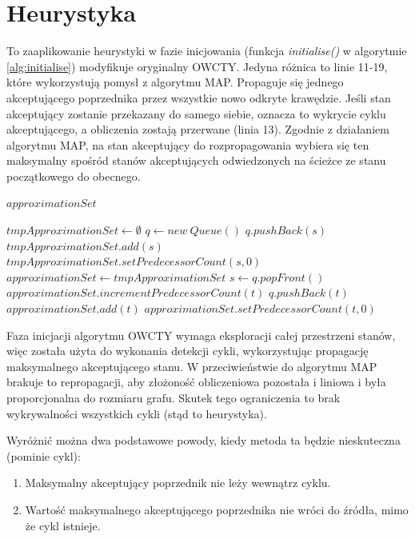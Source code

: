 \section{Heurystyka} \label{heuristic}

To zaaplikowanie heurystyki w fazie inicjowania (funkcja \textit{initialise()} w algorytmie \ref{alg:initialise}) modyfikuje oryginalny OWCTY.
Jedyna różnica to linie 11-19, które wykorzystują pomysł z algorytmu MAP.
Propaguje się jednego akceptującego poprzednika przez wszystkie nowo odkryte krawędzie.
Jeśli stan akceptujący zostanie przekazany do samego siebie, oznacza to wykrycie cyklu akceptującego, a obliczenia zostają przerwane (linia 13).
Zgodnie z działaniem algorytmu MAP, na stan akceptujący do rozpropagowania wybiera się ten maksymalny spośród stanów akceptujących odwiedzonych na ścieżce ze stanu początkowego do obecnego.

\begin{algorithm}
\caption{$ eliminateNoAccepting(approximationSet) $}
\label{alg:eliminateNoAccepting}
\begin{algorithmic}[1]
\REQUIRE $ approximationSet $

\STATE $ tmpApproximationSet \leftarrow \emptyset $
\STATE $ q \leftarrow new\ Queue() $
    \STATE $ q.pushBack(s) $
    \STATE $ tmpApproximationSet.add(s) $
    \STATE $ tmpApproximationSet.setPredecessorCount(s,0) $
  \ENDIF
\ENDFOR
\STATE $ approximationSet \leftarrow tmpApproximationSet $
  \STATE $ s \leftarrow q.popFront() $
      \STATE $ approximationSet.incrementPredecessorCount(t) $
    \ELSE
      \STATE $ q.pushBack(t) $
      \STATE $ approximationSet.add(t) $
      \STATE $ approximationSet.setPredecessorCount(t,0) $
    \ENDIF
  \ENDFOR
\ENDWHILE
\end{algorithmic}
\end{algorithm}

Faza inicjacji algorytmu OWCTY wymaga eksploracji całej przestrzeni stanów, więc została użyta do wykonania detekcji cykli, wykorzystując propagację maksymalnego akceptującego stanu.
W przeciwieństwie do algorytmu MAP brakuje to repropagacji, aby złożoność obliczeniowa pozostała i liniowa i była proporcjonalna do rozmiaru grafu.
Skutek tego ograniczenia to brak wykrywalności wszystkich cykli (stąd to heurystyka).

\noindent
Wyróżnić można dwa podstawowe powody, kiedy metoda ta będzie nieskuteczna (pominie cykl):
\begin{enumerate}
  \item Maksymalny akceptujący poprzednik nie leży wewnątrz cyklu.
  \item Wartość maksymalnego akceptującego poprzednika nie wróci do źródła, mimo że cykl istnieje.
\end{enumerate}

